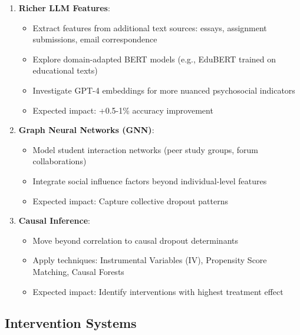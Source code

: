 \begin{enumerate}
\item \textbf{Richer LLM Features}:
\begin{itemize}
\item Extract features from additional text sources: essays, assignment submissions, email correspondence
\item Explore domain-adapted BERT models (e.g., EduBERT trained on educational texts)
\item Investigate GPT-4 embeddings for more nuanced psychosocial indicators
\item Expected impact: +0.5-1\% accuracy improvement
\end{itemize}

\item \textbf{Graph Neural Networks (GNN)}:
\begin{itemize}
\item Model student interaction networks (peer study groups, forum collaborations)
\item Integrate social influence factors beyond individual-level features
\item Expected impact: Capture collective dropout patterns
\end{itemize}

\item \textbf{Causal Inference}:
\begin{itemize}
\item Move beyond correlation to causal dropout determinants
\item Apply techniques: Instrumental Variables (IV), Propensity Score Matching, Causal Forests
\item Expected impact: Identify interventions with highest treatment effect
\end{itemize}
\end{enumerate}

\subsection{Intervention Systems}

